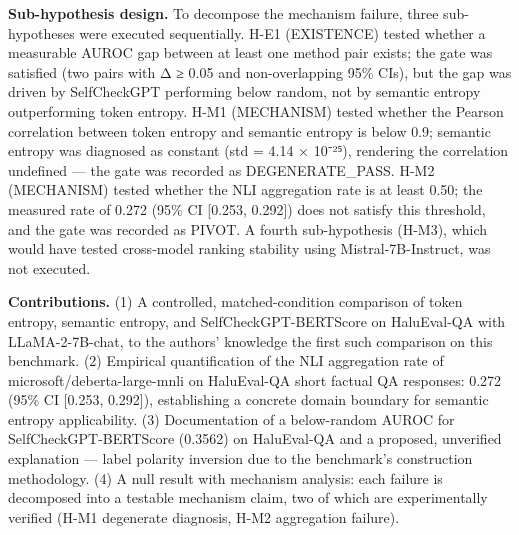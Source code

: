 \textbf{Sub-hypothesis design.} To decompose the mechanism failure, three sub-hypotheses were executed sequentially. H-E1 (EXISTENCE) tested whether a measurable AUROC gap between at least one method pair exists; the gate was satisfied (two pairs with Δ ≥ 0.05 and non-overlapping 95\% CIs), but the gap was driven by SelfCheckGPT performing below random, not by semantic entropy outperforming token entropy. H-M1 (MECHANISM) tested whether the Pearson correlation between token entropy and semantic entropy is below 0.9; semantic entropy was diagnosed as constant (std = 4.14 × 10⁻²⁵), rendering the correlation undefined — the gate was recorded as DEGENERATE_PASS. H-M2 (MECHANISM) tested whether the NLI aggregation rate is at least 0.50; the measured rate of 0.272 (95\% CI [0.253, 0.292]) does not satisfy this threshold, and the gate was recorded as PIVOT. A fourth sub-hypothesis (H-M3), which would have tested cross-model ranking stability using Mistral-7B-Instruct, was not executed.

\textbf{Contributions.} (1) A controlled, matched-condition comparison of token entropy, semantic entropy, and SelfCheckGPT-BERTScore on HaluEval-QA with LLaMA-2-7B-chat, to the authors' knowledge the first such comparison on this benchmark. (2) Empirical quantification of the NLI aggregation rate of microsoft/deberta-large-mnli on HaluEval-QA short factual QA responses: 0.272 (95\% CI [0.253, 0.292]), establishing a concrete domain boundary for semantic entropy applicability. (3) Documentation of a below-random AUROC for SelfCheckGPT-BERTScore (0.3562) on HaluEval-QA and a proposed, unverified explanation — label polarity inversion due to the benchmark's construction methodology. (4) A null result with mechanism analysis: each failure is decomposed into a testable mechanism claim, two of which are experimentally verified (H-M1 degenerate diagnosis, H-M2 aggregation failure).

